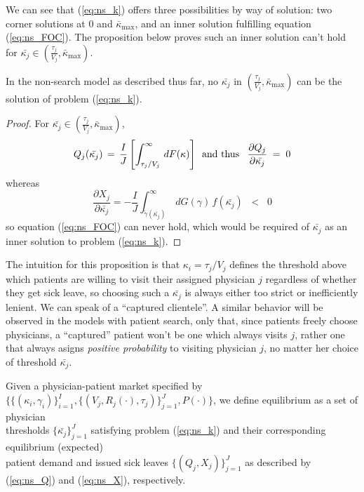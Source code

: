 \documentclass[../main.tex]{subfiles}
\begin{document}
We can see that (\ref{eq:ns_k}) offers three possibilities by way of solution: two corner solutions at 0 and $\bar{\kappa}_{\max}$, and an inner solution fulfilling equation (\ref{eq:ns_FOC}). The proposition below proves such an inner solution can't hold for $\bar{\kappa_j} \in (\frac{\tau_j}{V_j}, \bar{\kappa}_{\max})$.  

\begin{prop}
    \label{ns_prop2}
In the non-search model as described thus far, no $\bar{\kappa_j}$ in $(\frac{\tau_j}{V_j}, \bar{\kappa}_{\max})$ can be the solution of problem (\ref{eq:ns_k}).
\end{prop}

\begin{proof}
    For $\bar{\kappa_j} \in (\frac{\tau_j}{V_j}, \bar{\kappa}_{\max})$, \vspace{-0.5em}
    {\small \[Q_j(\bar{\kappa_j}) \,=\, \frac{I}{J}\left[ \int_{\tau_j/V_j}^{\infty}\,dF(\kappa) \right] \hspace{0.5em} \text{\normalsize and thus } \hspace{0.5em} \frac{\partial Q_j}{\partial\bar{\kappa_j}} \;=\; 0\]} whereas \vspace{-0.5em}
    {\small \[  \frac{\partial X_j}{\partial\bar{\kappa_j}} = - \frac{I}{J} \int_{\tilde{\gamma}(\bar{\kappa_j})}^{\infty} \,dG(\gamma) \,f(\bar{\kappa_j}) \; \; <  \; \; 0
    \]}
    so equation (\ref{eq:ns_FOC}) can never hold, which would be required of $\bar{\kappa_j}$ as an inner solution to problem (\ref{eq:ns_k}).
\end{proof}
The intuition for this proposition is that $\kappa_i = \tau_j/V_j$ defines the threshold above which patients are willing to visit their assigned physician $j$ regardless of whether they get sick leave, so choosing such a $\bar{\kappa_j}$ is always either too strict or inefficiently lenient. We can speak of a ``captured clientele''. A similar behavior will be observed in the models with patient search, only that, since patients freely choose physicians, a ``captured'' patient won't be one which always visits $j$, rather one that always asigns \textit{positive probability} to visiting physician $j$, no matter her choice of threshold $\bar{\kappa_j}$.
\vspace{0.5em}
\begin{equilibrium}
    \label{ns_eq}
Given a physician-patient market specified by \\ $\{\{(\kappa_i,\gamma_i)\}_{i =1}^{I},\{(V_j, R_j(\cdot), \tau_j)\}_{j =1}^{J}, P(\cdot)\}$, we define equilibrium as a set of physician \\ thresholds $\{\bar{\kappa_j}\}_{j =1}^{J}$ satisfying problem (\ref{eq:ns_k}) and their corresponding equilibrium (expected)\\ patient demand and issued sick leaves $\{(Q_j,X_j)\}_{j =1}^{J}$ as described by (\ref{eq:ns_Q}) and (\ref{eq:ns_X}), respectively.
\end{equilibrium}
\end{document}

